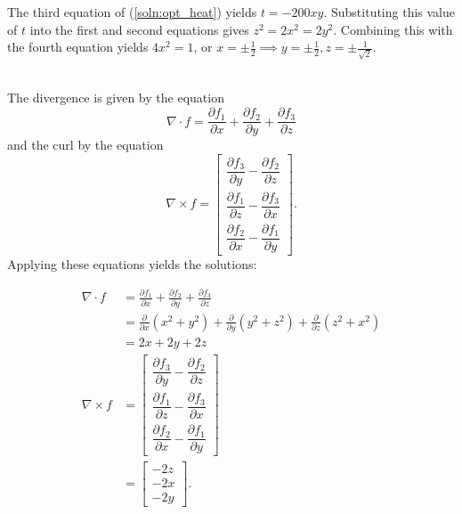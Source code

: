 The third equation of (\ref{soln:opt_heat}) yields $t = -200xy$.  Substituting
this value of $t$ into the first and second equations gives $z^2 = 2x^2 = 2y^2$.
Combining this with the fourth equation yields $4x^2 = 1$, or
$x = \pm \frac{1}{2} \implies y = \pm \frac{1}{2}, z = \pm \frac{1}{\sqrt{2}}$.
\item
{}\\
The divergence is given by the equation \[
 \nabla \cdot f = \frac{\partial f_1}{\partial x} + \frac{\partial f_2}{\partial y} + \frac{\partial f_3}{\partial z}
\] and the curl by the equation \[
 \nabla \times f = \begin{bmatrix}
  \dfrac{\partial f_3}{\partial y} - \dfrac{\partial f_2}{\partial z} \\
  \dfrac{\partial f_1}{\partial z} - \dfrac{\partial f_3}{\partial x} \\
  \dfrac{\partial f_2}{\partial x} - \dfrac{\partial f_1}{\partial y}
 \end{bmatrix}.
\]  Applying these equations yields the solutions:

\begin{align*}
 \nabla \cdot f &= \frac{\partial f_1}{\partial x} + \frac{\partial f_2}{\partial y} + \frac{\partial f_3}{\partial z} \\
 &= \frac{\partial}{\partial x}(x^2+y^2) + \frac{\partial}{\partial y}(y^2+z^2) + \frac{\partial}{\partial z}(z^2+x^2) \\
 &= 2x + 2y + 2z \\
 \nabla \times f &= \begin{bmatrix}
  \dfrac{\partial f_3}{\partial y} - \dfrac{\partial f_2}{\partial z} \\
  \dfrac{\partial f_1}{\partial z} - \dfrac{\partial f_3}{\partial x} \\
  \dfrac{\partial f_2}{\partial x} - \dfrac{\partial f_1}{\partial y}
 \end{bmatrix} \\
 &= \begin{bmatrix} - 2z \\ - 2x \\ - 2y \end{bmatrix}.
\end{align*}




\EEN
